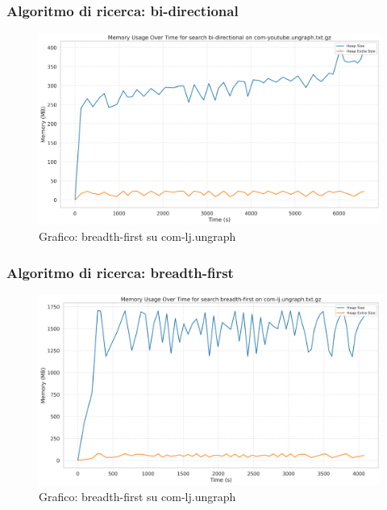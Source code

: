 \documentclass{article}
\begin{document}
\subsubsection{Algoritmo di ricerca: bi-directional}
\begin{figure}[h]\centering
	\includegraphics[width=\textwidth]{../plots/com-youtube.ungraph_bi-directional.png}
	\caption{Grafico: breadth-first su com-lj.ungraph}
\end{figure}
\subsubsection{Algoritmo di ricerca: breadth-first}
\begin{figure}[h]\centering
	\includegraphics[width=\textwidth]{../plots/com-lj.ungraph_breadth-first.png}
	\caption{Grafico: breadth-first su com-lj.ungraph}
\end{figure}
\end{document}
